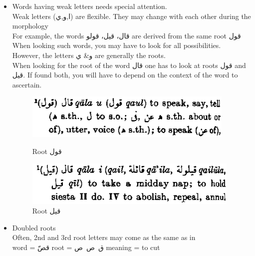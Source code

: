 \begin{itemize}	    \setlength{\itemsep}{5pt}
	\item Words having weak letters needs special attention. \\ Weak letters \textarabic{(ا,و,ي)} are flexible. They may change with each other during the morphology \\
	For example, the words \textarabic{قال، قيل، قولو} are derived from the same root \textarabic{قول} \\
	When looking such words, you may have to look for all possibilities. \\ However, the letters \textarabic{ و\& ي } are generally the roots. \\
	When looking for the root of the word \textarabic{قال} one has to look at roots \textarabic{قول} and  \textarabic{قيل}. If found both, you will have to depend on the context of the word to ascertain. 

\begin{figure}[h]
	\begin{minipage}{.5\textwidth}

			\centering
			\includegraphics[width=0.95\linewidth]{chapters/images/qwl}
			\caption{Root \textarabic{قول}}
			\label{fig:qwl}

		
	\end{minipage}
	\begin{minipage}{.5\textwidth}
			\centering
		\includegraphics[width=0.95\linewidth]{chapters/images/qyl}
		\caption{Root \textarabic{قيل}}
		\label{fig:qyl}
		
	\end{minipage}
\end{figure}
	
	
	\item Doubled roots	\\ 
	Often, 2nd and 3rd root letters may come as the same as in \\
	\qquad word = \textarabic{قصّ} \qquad root = \textarabic{ق~ص~ص}  \qquad meaning = to cut \\
	

\end{itemize}
